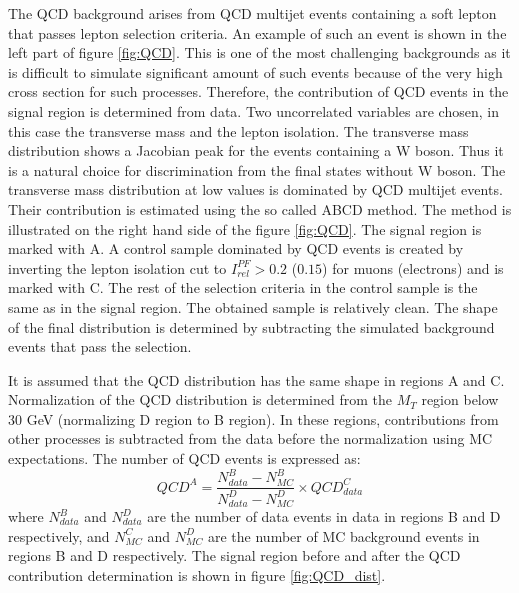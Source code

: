 The QCD background arises from QCD multijet events containing a soft lepton that passes lepton selection criteria. An example of such an event is shown in the left part of figure \ref{fig:QCD}. This is one of the most challenging backgrounds as it is difficult to simulate significant amount of such events because of the very high cross section for such processes. Therefore, the contribution of QCD events in the signal region is determined from data. Two uncorrelated variables are chosen, in this case the transverse mass and the lepton isolation. The transverse mass distribution shows a Jacobian peak for the events containing a W boson. Thus it is a natural choice for discrimination from the final states without W boson. The transverse mass distribution at low values is dominated by QCD multijet events. Their contribution is estimated using the so called ABCD method. The method is illustrated on the right hand side of the figure \ref{fig:QCD}. The signal region is marked with A. A control sample dominated by QCD events is created by inverting the lepton isolation cut to $I_{rel}^{PF}>0.2$ ($0.15$) for muons (electrons) and is marked with C. The rest of the selection criteria in the control sample is the same as in the signal region. The obtained sample is relatively clean. The shape of the final distribution is determined by subtracting the simulated background events that pass the selection. 
\par It is assumed that the QCD distribution has the same shape in regions A and C. Normalization of the QCD distribution is determined from the $M_T$ region below 30 GeV (normalizing D region to B region). In these regions, contributions from other processes is subtracted from the data before the normalization using MC expectations. The number of QCD events is expressed as:
\begin{equation}
QCD^A=\frac{N^B_{data}-N^B_{MC}}{N^D_{data}-N^D_{MC}}\times QCD^{C}_{data}
\end{equation}       
where $N^B_{data}$ and $N^D_{data}$ are the number of data events in data in regions B and D respectively, and $N^C_{MC}$ and $N^D_{MC}$ are the number of MC background events in regions B and D respectively. The signal region before and after the QCD contribution determination is shown in figure \ref{fig:QCD_dist}.
